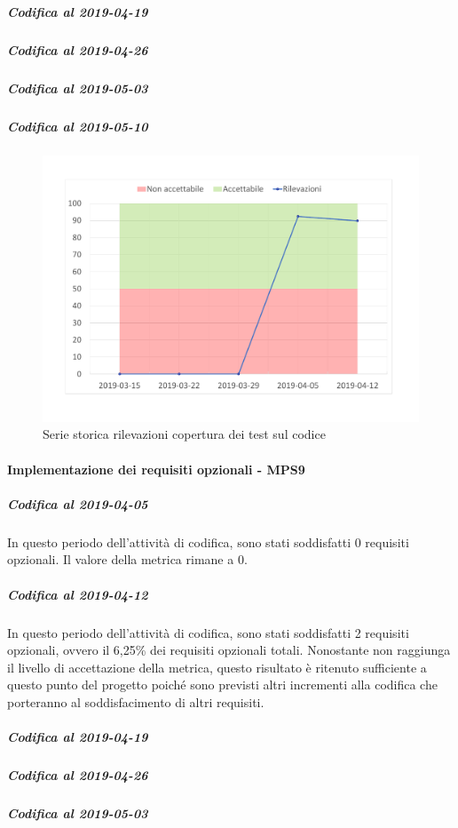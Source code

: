 \subparagraph{Codifica al 2019-04-19}

\subparagraph{Codifica al 2019-04-26}

\subparagraph{Codifica al 2019-05-03}

\subparagraph{Codifica al 2019-05-10}

\begin{figure}[H]
	\centering
	\includegraphics[scale=0.6]{images/resoconto/MPS8Chart.pdf}
	\caption{Serie storica rilevazioni copertura dei test sul codice}	
\end{figure}


\paragraph{Implementazione dei requisiti opzionali - MPS9}
\subparagraph{Codifica al 2019-04-05}
In questo periodo dell'attività di codifica, sono stati soddisfatti 0 requisiti opzionali. Il valore della metrica rimane a 0.

\subparagraph{Codifica al 2019-04-12}
In questo periodo dell'attività di codifica, sono stati soddisfatti 2 requisiti opzionali, ovvero il 6,25\% dei requisiti opzionali totali.
Nonostante non raggiunga il livello di accettazione della
metrica, questo risultato è ritenuto sufficiente a questo punto del progetto poiché sono previsti altri incrementi alla codifica che porteranno al soddisfacimento di altri requisiti.

\subparagraph{Codifica al 2019-04-19}

\subparagraph{Codifica al 2019-04-26}

\subparagraph{Codifica al 2019-05-03}

